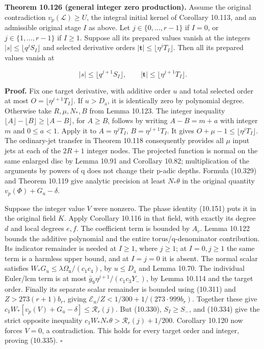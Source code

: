 \documentclass[
  11pt,
  a4paper,
]{article}
\begin{document}
\textbf{Theorem 10.126 (general integer zero production).} Assume the
original contradiction \(v_p(\mathcal L)\ge U\), the integral initial
kernel of Corollary 10.113, and an admissible original stage \(I\) as
above. Let \(j\in\{0,\ldots,r-1\}\) if \(I=0\), or
\(j\in\{1,\ldots,r-1\}\) if \(I\ge1\). Suppose all its prepared values
vanish at the integers \(|s|\le\lfloor q^jS_I\rfloor\) and selected
derivative orders \(|\boldsymbol t|\le\lfloor\eta^jT_I\rfloor\). Then
all its prepared values vanish at

\[
|s|\le\lfloor q^{j+1}S_I\rfloor,\qquad
|\boldsymbol t|\le\lfloor\eta^{j+1}T_I\rfloor.
\tag{10.335}
\]

\textbf{Proof.} Fix one target derivative, with additive order \(u\) and
total selected order at most \(O=\lfloor\eta^{j+1}T_I\rfloor\). If
\(u>D_{\mathrm a}\), it is identically zero by polynomial degree.
Otherwise take \(R,\mu,N_*,B\) from Lemma 10.123. The integer inequality
\(\lfloor A\rfloor-\lfloor B\rfloor\ge\lfloor A-B\rfloor\), for
\(A\ge B\), follows by writing \(A-B=m+a\) with integer \(m\) and
\(0\le a<1\). Apply it to \(A=\eta^jT_I\), \(B=\eta^{j+1}T_I\). It gives
\(O+\mu-1\le\lfloor\eta^jT_I\rfloor\). The ordinary-jet transfer in
Theorem 10.118 consequently provides all \(\mu\) input jets at each of
the \(2R+1\) integer nodes. The projected function is normal on the same
enlarged disc by Lemma 10.91 and Corollary 10.82; multiplication of the
arguments by powers of q does not change their p-adic depths. Formula
(10.329) and Theorem 10.119 give analytic precision at least
\(N_*\theta\) in the original quantity \(v_p(\Phi)+G_u-\delta\).

Suppose the integer value \(V\) were nonzero. The phase identity
(10.151) puts it in the original field \(K\). Apply Corollary 10.116 in
that field, with exactly its degree \(d\) and local degrees \(e,f\). The
coefficient term is bounded by \(A_r\). Lemma 10.122 bounds the additive
polynomial and the entire torus/q-denominator contribution. Its
indicator remainder is needed at \(I\ge1\), where \(j\ge1\); at
\(I=0,j\ge1\) the same term is a harmless upper bound, and at \(I=j=0\)
it is absent. The normal scalar satisfies
\(W_*G_u\le\lambda\Omega_{\mathrm n}/(c_1c_4)\), by
\(u\le D_{\mathrm a}\) and Lemma 10.70. The individual Euler/lcm term is
at most \(\bar g_9\eta^{j+1}/(c_1c_3Y_-)\), by Lemma 10.114 and the
target order. Finally its separate scalar remainder is bounded using
(10.311) and \(Z>273(r+1)b_r\), giving
\(\mathcal E_u/Z<1/300+1/(273\cdot999b_r)\). Together these give
\(c_1W_*[v_p(V)+G_u-\delta]\le\mathcal R_r(j)\). But (10.330),
\(S_I\ge S_-\), and (10.334) give the strict opposite inequality
\(c_1W_*N_*\theta>\mathcal R_r(j)+1/200\). Corollary 10.120 now forces
\(V=0\), a contradiction. This holds for every target order and integer,
proving (10.335). \(\square\)
\end{document}
